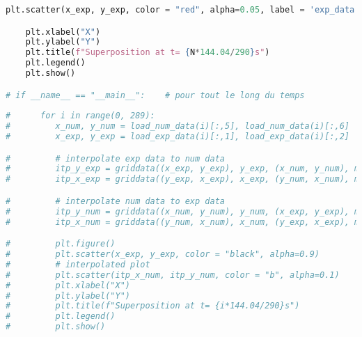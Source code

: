 \documentclass[12pt,a4paper]{article}
\begin{document}
\begin{lstlisting}[language=Python, caption={Superposition}]
    plt.scatter(x_exp, y_exp, color = "red", alpha=0.05, label = 'exp_data')

    plt.xlabel("X")
    plt.ylabel("Y")
    plt.title(f"Superposition at t= {N*144.04/290}s")
    plt.legend()
    plt.show()

# if __name__ == "__main__":    # pour tout le long du temps
     
#      for i in range(0, 289):
#         x_num, y_num = load_num_data(i)[:,5], load_num_data(i)[:,6]
#         x_exp, y_exp = load_exp_data(i)[:,1], load_exp_data(i)[:,2]

#         # interpolate exp data to num data
#         itp_y_exp = griddata((x_exp, y_exp), y_exp, (x_num, y_num), method='cubic')
#         itp_x_exp = griddata((y_exp, x_exp), x_exp, (y_num, x_num), method='cubic')

#         # interpolate num data to exp data
#         itp_y_num = griddata((x_num, y_num), y_num, (x_exp, y_exp), method='cubic')
#         itp_x_num = griddata((y_num, x_num), x_num, (y_exp, x_exp), method='cubic')

#         plt.figure()
#         plt.scatter(x_exp, y_exp, color = "black", alpha=0.9)
#         # interpolated plot
#         plt.scatter(itp_x_num, itp_y_num, color = "b", alpha=0.1)
#         plt.xlabel("X")
#         plt.ylabel("Y")
#         plt.title(f"Superposition at t= {i*144.04/290}s")
#         plt.legend()
#         plt.show()
\end{lstlisting}
\end{document}

